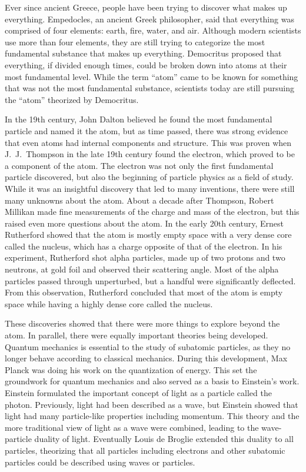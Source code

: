 Ever since ancient Greece, people have been trying to discover what makes up everything. Empedocles, an ancient Greek philosopher, said that everything was comprised of four elements: earth, fire, water, and air. Although modern scientists use more than four elements, they are still trying to categorize the most fundamental substance that makes up everything. Democritus proposed that everything, if divided enough times, could be broken down into atoms at their most fundamental level. While the term ``atom'' came to be known for something that was not the most fundamental substance, scientists today are still pursuing the ``atom'' theorized by Democritus. 

In the 19th century, John Dalton believed he found the most fundamental particle and named it the atom, but as time passed, there was strong evidence that even atoms had internal components and structure. This was proven when J.~J.~Thompson in the late 19th century found the electron, which proved to be a component of the atom. The electron was not only the first fundamental particle discovered, but also the beginning of particle physics as a field of study. While it was an insightful discovery that led to many inventions, there were still many unknowns about the atom. About a decade after Thompson, Robert Millikan made fine measurements of the charge and mass of the electron, but this raised even more questions about the atom. In the early 20th century, Ernest Rutherford showed that the atom is mostly empty space with a very dense core called the nucleus, which has a charge opposite of that of the electron. In his experiment, Rutherford shot alpha particles, made up of two protons and two neutrons, at gold foil and observed their scattering angle. Most of the alpha particles passed through unperturbed, but a handful were significantly deflected. From this observation, Rutherford concluded that most of the atom is empty space while having a highly dense core called the nucleus. 

These discoveries showed that there were more things to explore beyond the atom.  In parallel, there were equally important theories being developed. Quantum mechanics is essential to the study of subatomic particles, as they no longer behave according to classical mechanics. During this development, Max Planck was doing his work on the quantization of energy. This set the groundwork for quantum mechanics and also served as a basis to Einstein's work. Einstein formulated the important concept of light as a particle called the photon. Previously, light had been described as a wave, but Einstein showed that light had many particle-like properties including momentum. This theory and the more traditional view of light as a wave were combined, leading to the wave-particle duality of light. Eventually Louis de Broglie extended this duality to all particles, theorizing that all particles including electrons and other subatomic particles could be described using waves or particles.

